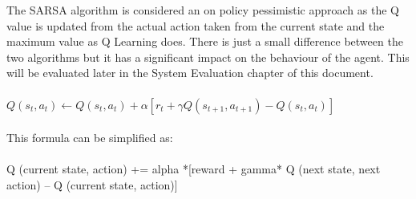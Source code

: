 The SARSA algorithm is considered an on policy pessimistic approach as the Q value is updated from the actual action taken from the current state and the maximum value as Q Learning does. There is just a small difference between the two algorithms but it has a significant impact on the behaviour of the agent. This will be evaluated later in the System Evaluation chapter of this document.\\\\
$Q(s_{t},a_{t})\leftarrow Q(s_{t},a_{t})+\alpha [r_{t}+\gamma Q(s_{t+1},a_{t+1})-Q(s_{t},a_{t})]$~\cite{Stateac29:online}\\\\
This formula can be simplified as:\\\\
Q (current state, action) += alpha *[reward + gamma*  Q (next state, next action) – Q (current state, action)]\\\\



